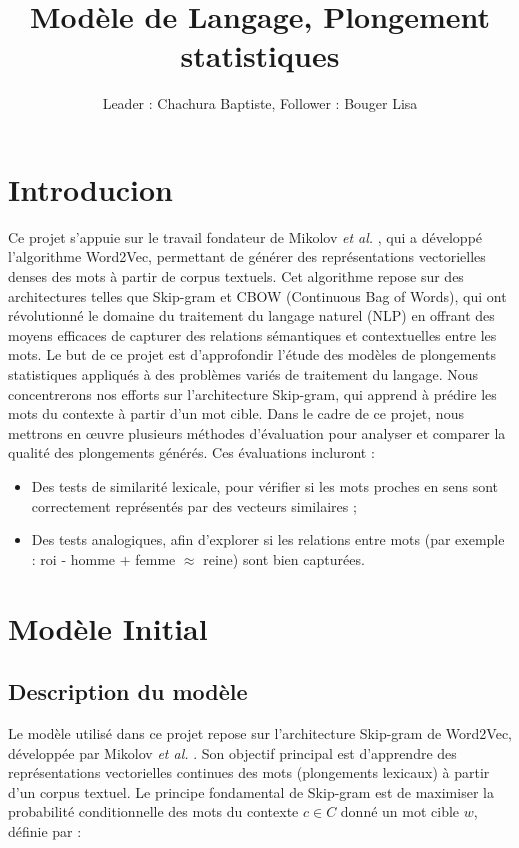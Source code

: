 \documentclass[12pt]{article}
\title{Modèle de Langage, Plongement statistiques}
\author{Leader : Chachura Baptiste, Follower : Bouger Lisa}
\begin{document}
\maketitle

\vspace{0.5in}


\section{Introducion}
Ce projet s’appuie sur le travail fondateur de Mikolov \textit{et al.} \cite{mikolov2013efficient}, qui a développé l’algorithme Word2Vec, permettant de générer 
des représentations vectorielles denses des mots à partir de corpus textuels. Cet algorithme repose sur des architectures telles que Skip-gram et CBOW (Continuous Bag of Words), 
qui ont révolutionné le domaine du traitement du langage naturel (NLP) en offrant des moyens efficaces de capturer des relations sémantiques et contextuelles entre les mots. 
Le but de ce projet est d’approfondir l’étude des modèles de plongements statistiques appliqués à des problèmes variés de traitement du langage. Nous concentrerons nos efforts 
sur l’architecture Skip-gram, qui apprend à prédire les mots du contexte à partir d’un mot cible. Dans le cadre de ce projet, nous mettrons en œuvre plusieurs méthodes d’évaluation 
pour analyser et comparer la qualité des plongements générés. Ces évaluations incluront :

\begin{itemize}
    \item Des tests de similarité lexicale, pour vérifier si les mots proches en sens sont correctement représentés par des vecteurs similaires ;
    \item Des tests analogiques, afin d'explorer si les relations entre mots (par exemple : roi - homme + femme $ \approx $ reine) sont bien capturées.
\end{itemize}


\section{Modèle Initial}
\subsection{Description du modèle}

Le modèle utilisé dans ce projet repose sur l’architecture Skip-gram de Word2Vec, développée par Mikolov \textit{et al.} \cite{mikolov2013efficient}. Son objectif principal est d’apprendre 
des représentations vectorielles continues des mots (plongements lexicaux) à partir d’un corpus textuel. Le principe fondamental de Skip-gram est de maximiser la probabilité conditionnelle 
des mots du contexte $c \in C$ donné un mot cible $w$, définie par : 
\end{document}
